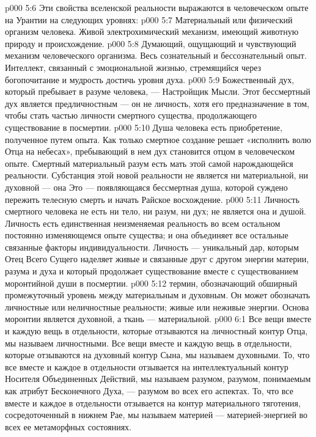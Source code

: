 \vs p000 5:6 \pc Эти свойства вселенской реальности выражаются в человеческом опыте на Урантии на следующих уровнях:
\vs p000 5:7 \bibnobreakspace {} Материальный или физический организм человека. Живой электрохимический механизм, имеющий животную природу и происхождение.
\vs p000 5:8 \bibnobreakspace {} Думающий, ощущающий и чувствующий механизм человеческого организма. Весь сознательный и бессознательный опыт. Интеллект, связанный с эмоциональной жизнью, стремящийся через богопочитание и мудрость достичь уровня духа.
\vs p000 5:9 \bibnobreakspace {} Божественный дух, который пребывает в разуме человека, --- Настройщик Мысли. Этот бессмертный дух является предличностным --- он не личность, хотя его предназначение в том, чтобы стать частью личности смертного существа, продолжающего существование в посмертии.
\vs p000 5:10 \bibnobreakspace {} Душа человека есть приобретение, полученное путем опыта. Как только смертное создание решает «исполнить волю Отца на небесах», пребывающий в нем дух становится отцом  в человеческом опыте. Смертный материальный разум есть мать этой самой нарождающейся реальности. Субстанция этой новой реальности не является ни материальной, ни духовной --- она  Это --- появляющаяся бессмертная душа, которой суждено пережить телесную смерть и начать Райское восхождение.
\vs p000 5:11 \pc {}\bibnobreakspace {} Личность смертного человека не есть ни тело, ни разум, ни дух; не является она и душой. Личность есть единственная неизменяемая реальность во всем остальном постоянно изменяющемся опыте существа; и она объединяет все остальные связанные факторы индивидуальности. Личность --- уникальный дар, которым Отец Всего Сущего наделяет живые и связанные друг с другом энергии материи, разума и духа и который продолжает существование вместе с существованием моронтийной души в посмертии.
\vs p000 5:12 \pc {}\bibnobreakspace {} термин, обозначающий обширный промежуточный уровень между материальным и духовным. Он может обозначать личностные или неличностные реальности; живые или неживые энергии. Основа моронтии является духовной, а ткань --- материальной.
\vs p000 6:1 Все вещи вместе и каждую вещь в отдельности, которые отзываются на личностный контур Отца, мы называем личностными. Все вещи вместе и каждую вещь в отдельности, которые отзываются на духовный контур Сына, мы называем духовными. То, что все вместе и каждое в отдельности отзывается на интеллектуальный контур Носителя Объединенных Действий, мы называем разумом, разумом, понимаемым как атрибут Бесконечного Духа, --- разумом во всех его аспектах. То, что все вместе и каждое в отдельности отзывается на контур материального тяготения, сосредоточенный в нижнем Рае, мы называем материей --- материей\hyp{}энергией во всех ее метаморфных состояниях.
